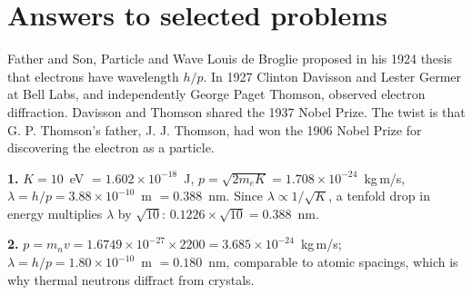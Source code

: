\begin{problemlist}



\end{problemlist}

\section{Answers to selected problems}\label{sec:schrodinger-answers}
\begin{didyouknow}{Father and Son, Particle and Wave}
Louis de Broglie proposed in his 1924 thesis that electrons have wavelength $h/p$. In 1927 Clinton Davisson and Lester Germer at Bell Labs, and independently George Paget Thomson, observed electron diffraction. Davisson and Thomson shared the 1937 Nobel Prize. The twist is that G. P. Thomson's father, J. J. Thomson, had won the 1906 Nobel Prize for discovering the electron as a particle.
\end{didyouknow}

\textbf{1.} $K=10$~eV $=1.602\times10^{-18}$~J, $p=\sqrt{2m_eK}=1.708\times10^{-24}$~kg\,m/s, $\lambda=h/p=3.88\times10^{-10}$~m $=0.388$~nm. Since $\lambda\propto1/\sqrt K$, a tenfold drop in energy multiplies $\lambda$ by $\sqrt{10}$: $0.1226\times\sqrt{10}=0.388$~nm.

\textbf{2.} $p=m_nv=1.6749\times10^{-27}\times2200=3.685\times10^{-24}$~kg\,m/s; $\lambda=h/p=1.80\times10^{-10}$~m $=0.180$~nm, comparable to atomic spacings, which is why thermal neutrons diffract from crystals.

